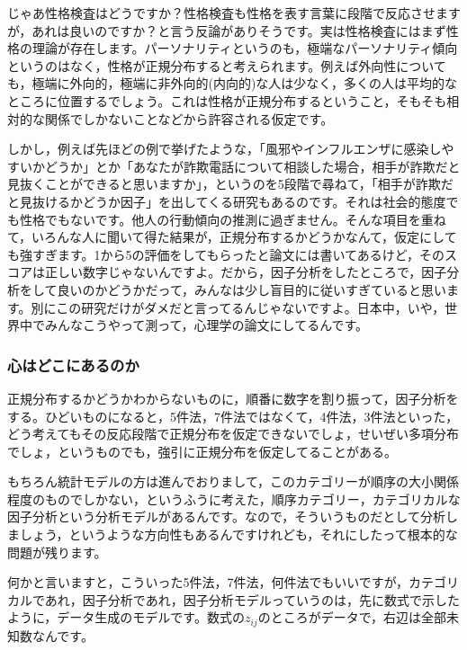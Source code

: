 \documentclass{ltjsbook}
\begin{document}
じゃあ性格検査はどうですか？性格検査も性格を表す言葉に段階で反応させますが，あれは良いのですか？と言う反論がありそうです。実は性格検査にはまず性格の理論が存在します。パーソナリティというのも，極端なパーソナリティ傾向というのはなく，性格が正規分布すると考えられます。例えば外向性についても，極端に外向的，極端に非外向的(内向的)な人は少なく，多くの人は平均的なところに位置するでしょう。これは性格が正規分布するということ，そもそも相対的な関係でしかないことなどから許容される仮定です。

しかし，例えば先ほどの例で挙げたような，「風邪やインフルエンザに感染しやすいかどうか」とか「あなたが詐欺電話について相談した場合，相手が詐欺だと見抜くことができると思いますか」，というのを5段階で尋ねて，「相手が詐欺だと見抜けるかどうか因子」を出してくる研究もあるのです\parencite{20219220024}。それは社会的態度でも性格でもないです。他人の行動傾向の推測に過ぎません。そんな項目を重ねて，いろんな人に聞いて得た結果が，正規分布するかどうかなんて，仮定にしても強すぎます。1から5の評価をしてもらったと論文には書いてあるけど，そのスコアは正しい数字じゃないんですよ。だから，因子分析をしたところで，因子分析をして良いのかどうかだって，みんなは少し盲目的に従いすぎていると思います。別にこの研究だけがダメだと言ってるんじゃないですよ。日本中，いや，世界中でみんなこうやって測って，心理学の論文にしてるんです。

\subsubsection{心はどこにあるのか}

正規分布するかどうかわからないものに，順番に数字を割り振って，因子分析をする。ひどいものになると，5件法，7件法ではなくて，4件法，3件法といった，どう考えてもその反応段階で正規分布を仮定できないでしょ，せいぜい多項分布でしょ，というものでも，強引に正規分布を仮定してることがある。

もちろん統計モデルの方は進んでおりまして，このカテゴリーが順序の大小関係程度のものでしかない，というふうに考えた，順序カテゴリー，カテゴリカルな因子分析という分析モデルがあるんです。なので，そういうものだとして分析しましょう，というような方向性もあるんですけれども，それにしたって根本的な問題が残ります。

何かと言いますと，こういった5件法，7件法，何件法でもいいですが，カテゴリカルであれ，因子分析であれ，因子分析モデルっていうのは，先に数式で示したように，データ生成のモデルです。数式の$z_{ij}$のところがデータで，右辺は全部未知数なんです。
\end{document}
